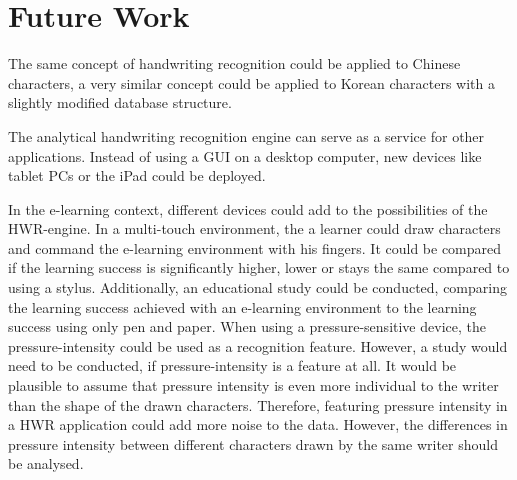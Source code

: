 

\section{Future Work}
\label{sec:conclusion:futurework}


The same concept of handwriting recognition could be applied to Chinese 
characters, a very similar concept could be applied to Korean characters
with a slightly modified database structure.


The analytical handwriting recognition engine can serve as a service for other 
applications. Instead of using a GUI on a desktop computer, new devices like
tablet PCs or the iPad could be deployed.

In the e-learning context, different devices could add to the possibilities
of the HWR-engine.
In a multi-touch environment, the a learner could draw characters and
command the e-learning environment with his fingers.
It could be compared if the learning success is significantly higher, lower or
stays the same compared to using a stylus.
Additionally, an educational study could be conducted, comparing the learning 
success achieved with an e-learning environment to the learning success
using only pen and paper.
When using a pressure-sensitive device, the pressure-intensity could be used as
a recognition feature. However, a study would need to be conducted,
if pressure-intensity is a feature at all.
It would be plausible to assume that pressure intensity is even more individual 
to the writer than the shape of the drawn characters. 
Therefore, featuring pressure intensity in a HWR application could add more 
noise to the data. However, the differences in pressure intensity 
between different characters drawn by the same writer should be analysed.


